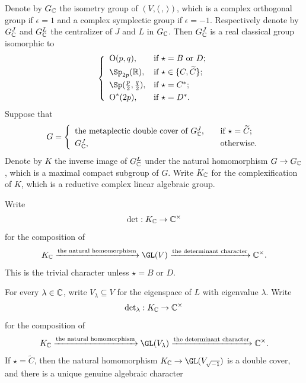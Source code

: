 \documentclass[11pt,a4paper]{amsart}
\newcommand{\oO}{\operatorname{O}}
\newcommand{\R}{\mathbb R}
\newcommand{\la}{\langle}
\newcommand{\ra}{\rangle}
\newcommand{\be}{\begin {equation}}
\newcommand{\ee}{\end {equation}}
\numberwithin{equation}{section}
\theoremstyle{remark}
\def\subset{\subseteq}
\begin{document}
Denote by $G_{\mathbb{C}}$ the isometry group of $ (V, \la\,,\,\ra)$, which is a complex orthogonal group if $\epsilon=1$ and a complex symplectic group if $\epsilon=-1$. Respectively denote by  $G_{\C}^{J}$  and  $G_{\mathbb{C}}^{L}$ the centralizer of $J$ and $L$ in  $G_{\mathbb{C}}$. Then $G_{\C}^{J}$ is a real classical group isomorphic to
\be\label{realg}
 \left\{
     \begin{array}{ll}
         \oO(p, q), &\hbox{if $\star=B$ or $D$}; \smallskip\\
            \Sp_{2p}(\R), &\hbox{if $\star\in \{C,\widetilde C\}$}; \smallskip\\
                   \Sp(\frac{p}{2}, \frac{q}{2}), &\hbox{if $\star=C^*$}; \smallskip \\
          \oO^*(2p), &\hbox{if $\star=D^*$}.\\
            \end{array}
   \right.
\ee
Suppose that 
\be\label{defg}
G= \left\{
     \begin{array}{ll}
       \textrm{the metaplectic double cover of $G_{\C}^{J}$}, \quad &\hbox{if $\star=\widetilde C$}; \smallskip\\
            G_{\C}^{J},  \quad  &\hbox{otherwise}.\\
            \end{array}
   \right.
\ee
Denote by $K$ the inverse image of  $G_{\mathbb{C}}^{L}$  under the natural homomorphism $G\rightarrow G_{\mathbb{C}}$, which is a maximal compact subgroup of $G$. Write $K_{\mathbb{C}}$ for the complexification of  $K$, which is a reductive complex linear algebraic group.

Write
\be\label{comdet}
{\det} : K_{\C}\rightarrow \C^\times
\ee
for the composition of
\[
   K_{\C}\xrightarrow{\textrm{the natural homomorphism}} \GL(V)\xrightarrow{\textrm{the determinant character}}\C^\times.
\]
This is the trivial character unless $\star=B$ or $D$.

For every $\lambda\in \mathbb{C}$, write $V_{\lambda}\subset V$ for the eigenspace of $L$ with eigenvalue $\lambda$. Write
\be\label{comdetlam}
{\det}_\lambda : K_{\C}\rightarrow \C^\times
\ee
for the composition of
\begin{equation*}\label{dethalf0}
   K_{\C}\xrightarrow{\textrm{the natural homomorphism}} \GL(V_{\lambda})\xrightarrow{\textrm{the determinant character}}\C^\times.
\end{equation*}
If $\star=\widetilde C$, then the natural homomorphism  $ K_{\C}\rightarrow \GL(V_{\sqrt{-1}})$ is a double cover, and there is a unique genuine algebraic character
\end{document}
